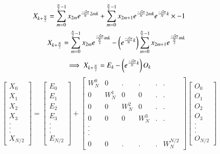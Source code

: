 \documentclass[journal,12pt,twocolumn]{IEEEtran}
\begin{document}
\begin{align}
     X_{k+\frac{N}{2}} = \sum _{m=0}^{\frac{N}{2}-1}x_{2m}e^{\frac{-j2\pi}{N}2mk} + \sum _{m=0}^{\frac{N}{2}-1}x_{2m+1}e^{\frac{-j2\pi}{N}2mk}e^{\frac{-j2\pi}{N}k}\times -1
     \\
X_{k+\frac{N}{2}} = \sum _{m=0}^{\frac{N}{2}-1}x_{2m}e^{\frac{-j2\pi}{\frac{N}{2}}mk} - \left( e^{\frac{-j2\pi}{N}k}\right)\sum _{m=0}^{\frac{N}{2}-1}x_{2m+1}e^{\frac{-j2\pi}{\frac{N}{2}}mk}
\end{align}
\begin{align}
\implies X_{k+\frac{N}{2}} = E_{k} - \left( e^{\frac{-j2\pi}{N}k}\right)O_{k}
\end{align}
\begin{equation}
\begin{bmatrix}
X_{0} \\
X_{1} \\
X_{2} \\
X_{3} \\
. \\
. \\
. \\
X_{N/2}
\end{bmatrix}
= 
\begin{bmatrix}
E_{0} \\
E_{1} \\
E_{2} \\
E_{3} \\
. \\
. \\
. \\
E_{N/2}
\end{bmatrix}
+
\begin{bmatrix}
W^{0}_{N} & 0  &. &. &.&. \\
0 & W^{1}_{N} & 0 & 0 &. &. \\
0 & 0 & W^{2}_{N} & 0 &. &. \\
0 & 0 & 0 & W^{3}_{N} &. &.\\
.\\
.\\
.\\
0 & 0 &. &.&. &W^{N/2}_{N}
\end{bmatrix}
\begin{bmatrix}
O_{0} \\
O_{1} \\
O_{2} \\
O_{3} \\
. \\
. \\
. \\
O_{N/2}
\end{bmatrix}
\end{equation}
\end{document}
